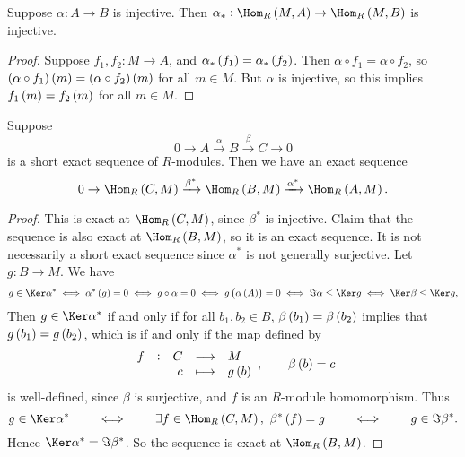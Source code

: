 \begin{proposition}
Suppose $ \alpha : A \to B $ is injective. Then $ \alpha_* : \Hom_R\br{M, A} \to \Hom_R\br{M, B} $ is injective.
\end{proposition}

\begin{proof}
Suppose $ f_1, f_2 : M \to A $, and $ \alpha_*\br{f_1} = \alpha_*\br{f_2} $. Then $ \alpha \circ f_1 = \alpha \circ f_2 $, so $ \br{\alpha \circ f_1}\br{m} = \br{\alpha \circ f_2}\br{m} $ for all $ m \in M $. But $ \alpha $ is injective, so this implies $ f_1\br{m} = f_2\br{m} $ for all $ m \in M $.
\end{proof}

\pagebreak

\begin{proposition}
Suppose
$$ 0 \to A \xrightarrow{\alpha} B \xrightarrow{\beta} C \to 0 $$
is a short exact sequence of $ R $-modules. Then we have an exact sequence
$$ 0 \to \Hom_R\br{C, M} \xrightarrow{\beta^*} \Hom_R\br{B, M} \xrightarrow{\alpha^*} \Hom_R\br{A, M}. $$
\end{proposition}

\begin{proof}
This is exact at $ \Hom_R\br{C, M} $, since $ \beta^* $ is injective. Claim that the sequence is also exact at $ \Hom_R\br{B, M} $, so it is an exact sequence. It is not necessarily a short exact sequence since $ \alpha^* $ is not generally surjective. Let $ g : B \to M $. We have
$$ g \in \Ker \alpha^* \iff \alpha^*\br{g} = 0 \iff g \circ \alpha = 0 \iff g\br{\alpha\br{A}} = 0 \iff \Im \alpha \le \Ker g \iff \Ker \beta \le \Ker g, $$
Then $ g \in \Ker \alpha^* $ if and only if for all $ b_1, b_2 \in B $, $ \beta\br{b_1} = \beta\br{b_2} $ implies that $ g\br{b_1} = g\br{b_2} $, which is if and only if the map defined by
$$ \function[f]{C}{M}{c}{g\br{b}}, \qquad \beta\br{b} = c $$
is well-defined, since $ \beta $ is surjective, and $ f $ is an $ R $-module homomorphism. Thus
$$ g \in \Ker \alpha^* \qquad \iff \qquad \exists f \in \Hom_R\br{C, M}, \ \beta^*\br{f} = g \qquad \iff \qquad g \in \Im \beta^*. $$
Hence $ \Ker \alpha^* = \Im \beta^* $. So the sequence is exact at $ \Hom_R\br{B, M} $.
\end{proof}


